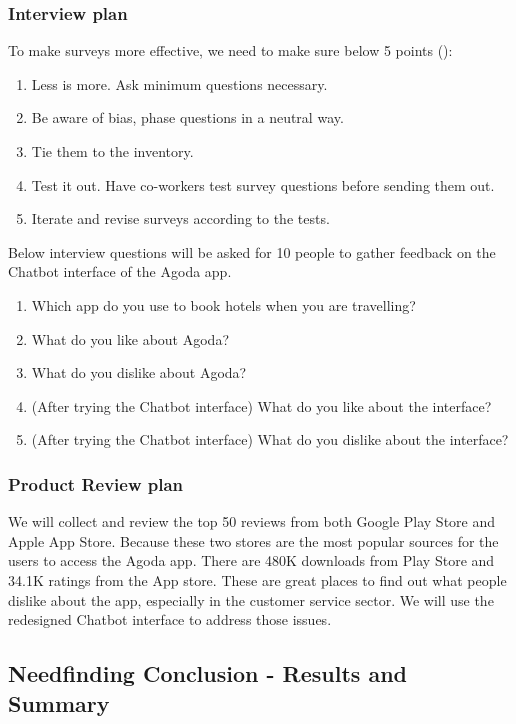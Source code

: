 \documentclass[
	letterpaper, %
]{jdf}
\begin{document}
\subsubsection{Interview plan}
To make surveys more effective, we need to make sure below 5 points (\cite{joyner2016c}):
\begin{enumerate}
	\item Less is more. Ask minimum questions necessary.
	\item Be aware of bias, phase questions in a neutral way.
	\item Tie them to the inventory.
	\item Test it out. Have co-workers test survey questions before sending them out.
	\item Iterate and revise surveys according to the tests.
\end{enumerate}
Below interview questions will be asked for 10 people to gather feedback on the Chatbot interface of the Agoda app. 
\begin{enumerate}
	\item Which app do you use to book hotels when you are travelling?
	\item What do you like about Agoda?
	\item What do you dislike about Agoda?
	\item (After trying the Chatbot interface) What do you like about the interface?
	\item (After trying the Chatbot interface) What do you dislike about the interface?
\end{enumerate}

\subsubsection{Product Review plan}
We will collect and review the top 50 reviews from both Google Play Store and Apple App Store. Because these two stores are the most popular sources for the users to access the Agoda app. There are 480K downloads from Play Store and 34.1K ratings from the App store. These are great places to find out what people dislike about the app, especially in the customer service sector. We will use the redesigned Chatbot interface to address those issues.

\subsection{Needfinding Conclusion - Results and Summary}
\end{document}
